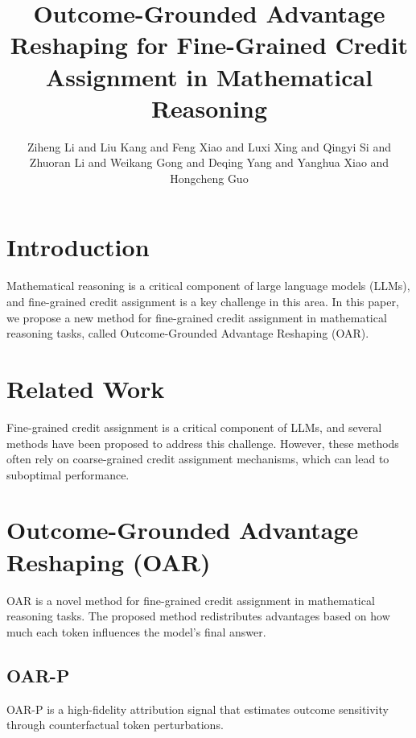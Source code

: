 \documentclass{article}
\begin{document}
        
        \title{Outcome-Grounded Advantage Reshaping for Fine-Grained Credit Assignment in Mathematical Reasoning}
        
        \author{Ziheng Li and Liu Kang and Feng Xiao and Luxi Xing and Qingyi Si and Zhuoran Li and Weikang Gong and Deqing Yang and Yanghua Xiao and Hongcheng Guo}
        
        \date{}
        
        \maketitle
        
        \section{Introduction}
        \label{sec:intro}
        Mathematical reasoning is a critical component of large language models (LLMs), and fine-grained credit assignment is a key challenge in this area. In this paper, we propose a new method for fine-grained credit assignment in mathematical reasoning tasks, called Outcome-Grounded Advantage Reshaping (OAR).
        
        \section{Related Work}
        \label{sec:related}
        Fine-grained credit assignment is a critical component of LLMs, and several methods have been proposed to address this challenge. However, these methods often rely on coarse-grained credit assignment mechanisms, which can lead to suboptimal performance.
        
        \section{Outcome-Grounded Advantage Reshaping (OAR)}
        \label{sec:oar}
        OAR is a novel method for fine-grained credit assignment in mathematical reasoning tasks. The proposed method redistributes advantages based on how much each token influences the model's final answer.
        
        \subsection{OAR-P}
        \label{subsec:oar-p}
        OAR-P is a high-fidelity attribution signal that estimates outcome sensitivity through counterfactual token perturbations.
        
\end{document}
